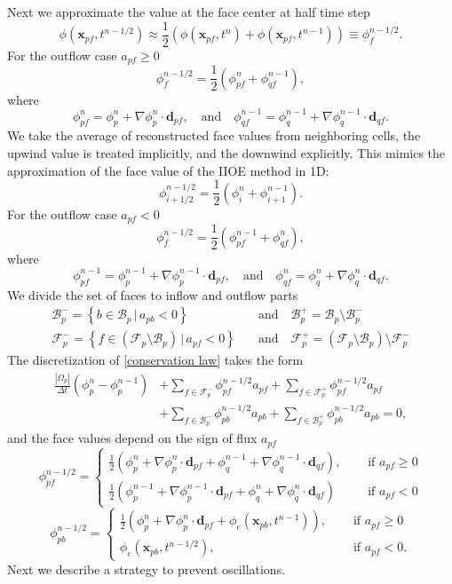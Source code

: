 \documentclass{article}
\begin{document}
Next we approximate the value at the face center at half time step \[ \phi(\boldsymbol{x}_{pf},t^{n-1/2})
\approx
\frac{1}{2}(\phi(\boldsymbol{x}_{pf},t^n) + \phi(\boldsymbol{x}_{pf},t^{n-1}))
\equiv
\phi_{f}^{n-1/2}. \]
For the outflow case $ a_{pf} \geq 0 $
\[ \phi_{f}^{n-1/2} = \frac{1}{2}(\phi_{pf}^n + \phi_{qf}^{n-1}), \]
where 
\[ \phi_{pf}^{n} = \phi_p^{n} + \nabla\phi_p^{n}\cdot\boldsymbol{d}_{pf},
\quad \text{and} \quad
\phi_{qf}^{n-1} = \phi_q^{n-1} + \nabla\phi_q^{n-1}\cdot\boldsymbol{d}_{qf}. \]
We take the average of reconstructed face values from neighboring cells,  the upwind value is treated implicitly, and the downwind explicitly. This mimics the approximation of the face value of the IIOE method in 1D:
\[ \phi_{i+1/2}^{n-1/2} = \frac{1}{2}(\phi_i^{n} + \phi_{i+1}^{n-1}). \]
For the outflow case $ a_{pf} < 0 $
\[ \phi_{f}^{n-1/2} = \frac{1}{2}(\phi_{pf}^{n-1} + \phi_{qf}^{n}), \]
where 
\[ \phi_{pf}^{n-1} = \phi_p^{n-1} + \nabla\phi_p^{n-1}\cdot\boldsymbol{d}_{pf},
\quad \text{and} \quad
\phi_{qf}^{n} = \phi_q^{n} + \nabla\phi_q^{n}\cdot\boldsymbol{d}_{qf}. \]
We divide the set of faces to inflow and outflow parts
\begin{align*}
	\mathcal{B}_p^- = \left\{b \in \mathcal{B}_p\, |\, a_{pb} < 0\right\}\ \quad &\text{and} \quad
	\mathcal{B}_p^+ = \mathcal{B}_p \setminus \mathcal{B}_p^- \\
	\mathcal{F}_p^- = \left\{f \in (\mathcal{F}_p \setminus \mathcal{B}_p) \, |\, a_{pf} < 0\right\} \quad &\text{and} \quad 
	\mathcal{F}_p^+ = (\mathcal{F}_p \setminus \mathcal{B}_p) \setminus \mathcal{F}_p^- 
\end{align*}
The discretization of \eqref{conservation law} takes the form
\begin{align}
	\nonumber
	\frac{|\Omega_p|}{\Delta t}(\phi_p^{n} - \phi_p^{n-1}) &+ \sum_{f \in \mathcal{F}_p^-} \phi_{pf}^{n-1/2} a_{pf} + \sum_{f \in \mathcal{F}_p^+} \phi_{pf}^{n-1/2} a_{pf}\\ 
	&+ \sum_{f \in \mathcal{B}_p^-} \phi_{pb}^{n-1/2} a_{pb} + \sum_{f \in \mathcal{B}_p^+} \phi_{pb}^{n-1/2} a_{pb} = 0,
\end{align}
and the face values depend on the sign of flux $ a_{pf} $
\[ \phi_{pf}^{n-1/2} =
\begin{cases}
	\frac{1}{2}(\phi_p^n + \nabla\phi_p^n\cdot\boldsymbol{d}_{pf} + 
	\phi_q^{n-1} + \nabla\phi_q^{n-1}\cdot\boldsymbol{d}_{qf}), \quad &\text{ if } a_{pf} \geq 0 \\
	\frac{1}{2}(\phi_p^{n-1} + \nabla\phi_p^{n-1}\cdot\boldsymbol{d}_{pf} + 
	\phi_q^{n} + \nabla\phi_q^{n}\cdot\boldsymbol{d}_{qf}) \quad &\text{ if } a_{pf} < 0
\end{cases} \]
\[ \phi_{pb}^{n-1/2} =
\begin{cases}
	\frac{1}{2}\left(\phi_p^n + \nabla\phi_p^n\cdot\boldsymbol{d}_{pf} + 
	\phi_e(\boldsymbol{x}_{pb}, t^{n-1})\right), \quad &\text{ if } a_{pf} \geq 0 \\
	\phi_e(\boldsymbol{x}_{pb}, t^{n-1/2}),\quad &\text{ if } a_{pf} < 0.
\end{cases} \]
Next we describe a strategy to prevent oscillations.\\
\end{document}
